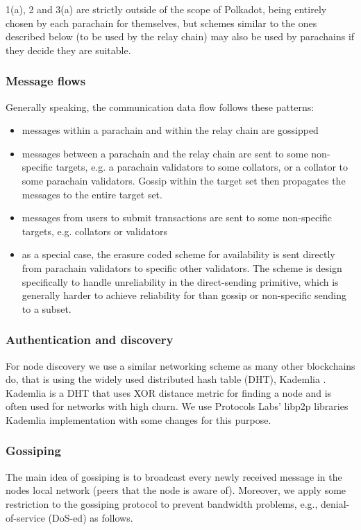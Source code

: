 1(a), 2 and 3(a) are strictly outside of the scope of Polkadot, being entirely chosen by each parachain for themselves, but schemes similar to the ones described below (to be used by the relay chain) may also be used by parachains if they decide they are suitable.

\subsubsection{Message flows}

Generally speaking, the communication data flow follows these patterns:

\begin{itemize}
\item messages within a parachain and within the relay chain are gossipped
\item messages between a parachain and the relay chain are sent to some non-specific targets, e.g. a parachain validators to some collators, or a collator to some parachain validators. Gossip within the target set then propagates the messages to the entire target set.
\item messages from users to submit transactions are sent to some non-specific targets, e.g. collators or validators
\item as a special case, the erasure coded scheme for availability is sent directly from parachain validators to specific other validators. The scheme is design specifically to handle unreliability in the direct-sending primitive, which is generally harder to achieve reliability for than gossip or non-specific sending to a subset.
\end{itemize}

\subsubsection{Authentication and discovery}

For node discovery we use a similar networking scheme as many other blockchains do, that is using the widely used distributed hash table (DHT), Kademlia \cite{Maymounkov:2002:Kademila}. Kademlia is a DHT that uses XOR distance metric for finding a node and is often used for networks with high churn. We use Protocols Labs' libp2p libraries \cite{} Kademlia implementation with some changes for this purpose.

\subsubsection{Gossiping}
The main idea of gossiping is to broadcast every newly received message in the nodes local network (peers that the node is aware of). Moreover, we apply some restriction to the gossiping protocol to prevent bandwidth problems, e.g., denial-of-service (DoS-ed) as follows.

